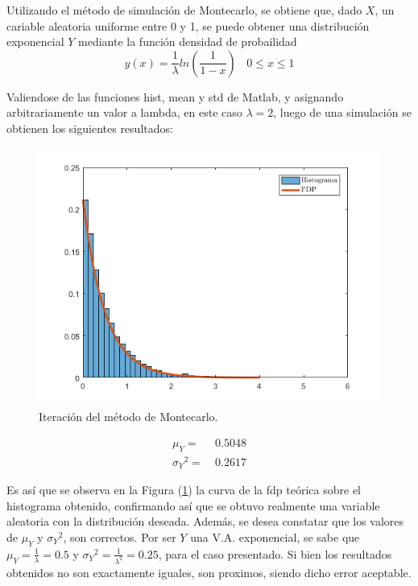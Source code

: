 



Utilizando el método de simulación de Montecarlo, se obtiene que, dado $X$, un cariable aleatoria uniforme entre 0 y 1, se puede obtener una distribución exponencial $Y$ mediante la función densidad de probailidad
\begin{equation}
	y(x) = \frac{1}{\lambda} ln\left( \frac{1}{1 - x} \right) \ \ \ \ 0 \leq x \leq 1
\end{equation}

Valiendose de las funciones hist, mean y std de Matlab, y asignando arbitrariamente un valor a lambda, en este caso $\lambda = 2$, luego de una simulación se obtienen los siguientes resultados:
\begin{figure}[H]
	\centering
	\includegraphics[width=0.7\linewidth]{./ImagenesEjercicio1/Simu-1.png}
	\caption{Iteración del método de Montecarlo.}
	\label{fig:primerit}
\end{figure}

\begin{equation}
\begin{aligned}
		\mu_{Y} = & \ 0.5048 \\
		{\sigma_{Y}}^{2} = & \ 0.2617
\end{aligned}
\end{equation}

Es así que se observa en la Figura (\ref{fig:primerit}) la curva de la fdp teórica sobre el histograma obtenido, confirmando así que se obtuvo realmente una variable aleatoria con la distribución deseada. Además, se desea constatar que los valores de $\mu_{Y}$ y ${\sigma_{Y}}^{2}$, son correctos. Por ser $Y$ una V.A. exponencial, se sabe que $\mu_{Y} = \frac{1}{\lambda} = 0.5$ y ${\sigma_{Y}}^{2} = \frac{1}{\lambda^2} = 0.25$, para el caso presentado. Si bien los resultados obtenidos no son exactamente iguales, son proximos, siendo dicho error aceptable.  

